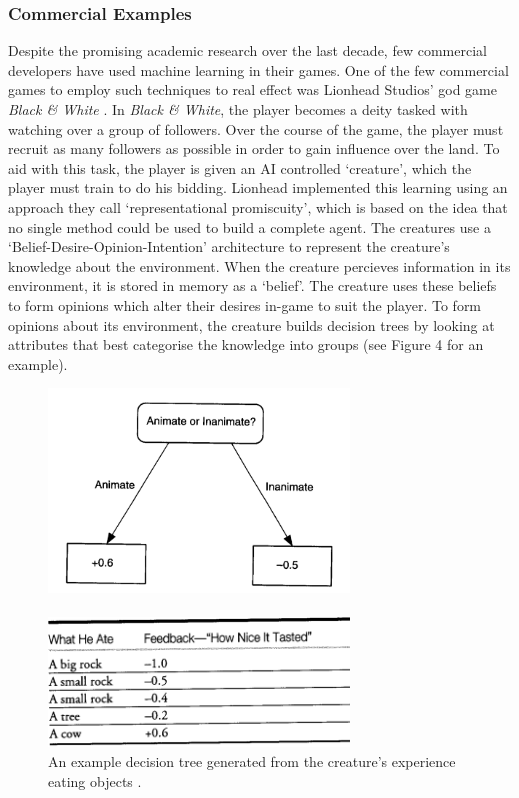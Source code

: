 \documentclass[a4paper,oneside]{report}
\begin{document}
\subsubsection{Commercial Examples}

Despite the promising academic research over the last decade, few commercial developers have used machine learning in their games. One of the few commercial games to employ such techniques to real effect was Lionhead Studios' god game \emph{Black \& White} \cite{:hc}. In \emph{Black \& White}, the player becomes a deity tasked with watching over a group of followers. Over the course of the game, the player must recruit as many followers as possible in order to gain influence over the land. To aid with this task, the player is given an AI controlled `creature', which the player must train to do his bidding. Lionhead implemented this learning using an approach they call `representational promiscuity', which is based on the idea that no single method could be used to build a complete agent. The creatures use a `Belief-Desire-Opinion-Intention' architecture to represent the creature's knowledge about the environment. When the creature percieves information in its environment, it is stored in memory as a `belief'. The creature uses these beliefs to form opinions which alter their desires in-game to suit the player. To form opinions about its environment, the creature builds decision trees by looking at attributes that best categorise the knowledge into groups (see Figure 4 for an example).

\begin{figure}[h!]
	\centering
		\includegraphics[width=80mm]{sources/images/TastyTree}\paragraph{}
    	\includegraphics[width=80mm]{sources/images/TastyTable}
    	\caption{An example decision tree generated from the creature's experience eating objects \cite{:hc}.}
\end{figure}
\end{document}
